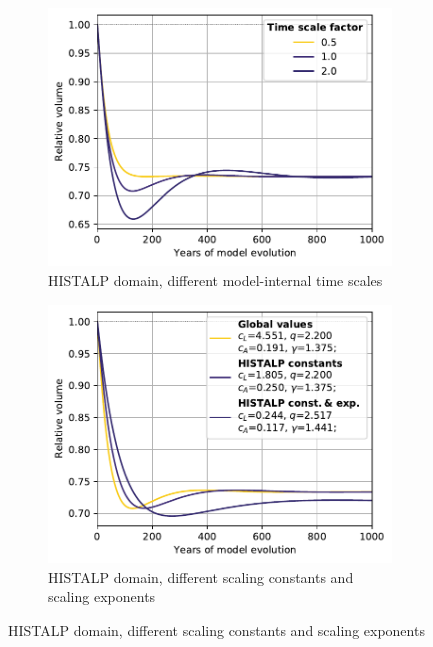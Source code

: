 \begin{figure}[ht]
    \begin{subfigure}[b]{0.476\textwidth}
      \caption{HISTALP domain, different model-internal time scales}
      \label{fig:sensitivity:time_scales_histalp}
      \centering
      \includegraphics[width=\textwidth]{../plots/final_plots/sensitivity/time_scales_histalp.pdf}
    \end{subfigure}
    \hfill
    \begin{subfigure}[b]{0.476\textwidth}
      \caption{HISTALP domain, different scaling constants and scaling exponents}
      \label{fig:sensitivity:scaling_params_histalp}
      \centering
      \includegraphics[width=\textwidth]{../plots/final_plots/sensitivity/scaling_params_histalp.pdf}
    \end{subfigure}
    

\end{figure}
